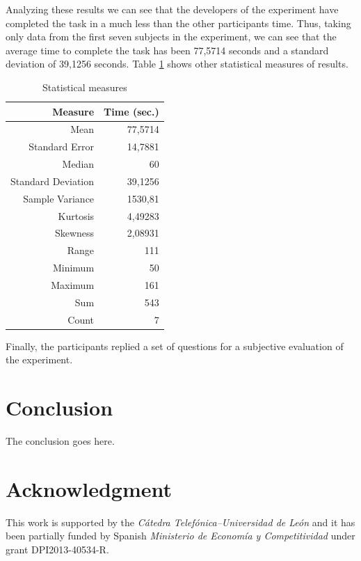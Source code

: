 \documentclass[journal,twoside]{JoPhA}
\begin{document}
Analyzing these results we can see that the developers of the experiment have completed the task in a much less than the other participants time. Thus, taking only data from the first seven subjects in the experiment, we can see that the average time to complete the task has been 77,5714 seconds and a standard deviation of 39,1256 seconds. Table \ref{measures} shows other statistical measures of results.

\begin{table}[h]
\centering
\caption{\label{measures}Statistical measures}
\begin{tabular}{rr}
\hline 
\textbf{\footnotesize{}Measure} & \textbf{\footnotesize{}Time (sec.)}\tabularnewline
\hline 
{\footnotesize{}Mean} & {\footnotesize{}77,5714}\tabularnewline
{\footnotesize{}Standard Error } & {\footnotesize{}14,7881 }\tabularnewline
{\footnotesize{}Median} & {\footnotesize{}60}\tabularnewline
{\footnotesize{}Standard Deviation} & {\footnotesize{}39,1256}\tabularnewline
{\footnotesize{}Sample Variance} & {\footnotesize{}1530,81 }\tabularnewline
{\footnotesize{}Kurtosis} & {\footnotesize{}4,49283}\tabularnewline
{\footnotesize{}Skewness} & {\footnotesize{}2,08931}\tabularnewline
{\footnotesize{}Range} & {\footnotesize{}111 }\tabularnewline
{\footnotesize{}Minimum} & {\footnotesize{}50}\tabularnewline
{\footnotesize{}Maximum} & {\footnotesize{}161}\tabularnewline
{\footnotesize{}Sum} & {\footnotesize{}543}\tabularnewline
{\footnotesize{}Count} & {\footnotesize{}7}\tabularnewline
\hline 
\end{tabular}
\end{table}


Finally, the participants replied a set of questions for a subjective evaluation of the experiment.


\section{Conclusion}

The conclusion goes here.


\section*{Acknowledgment}

This work is supported by the \textit{C\'{a}tedra Telef\'{o}nica--Universidad de Le\'{o}n} and it has been partially funded by Spanish \textit{Ministerio de Econom\'{i}a y Competitividad} under grant DPI2013-40534-R.
\end{document}
